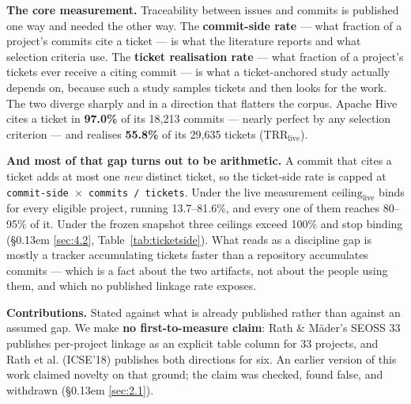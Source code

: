 \documentclass[conference]{IEEEtran}
\begin{document}
\textbf{The core measurement.} Traceability between issues and commits is published one way and needed the other way. The \textbf{commit-side rate} --- what fraction of a project's commits cite a ticket --- is what the literature reports and what selection criteria use. The \textbf{ticket realisation rate} --- what fraction of a project's tickets ever receive a citing commit --- is what a ticket-anchored study actually depends on, because such a study samples tickets and then looks for the work. The two diverge sharply and in a direction that flatters the corpus. Apache Hive cites a ticket in \textbf{97.0\%} of its 18,213 commits --- nearly perfect by any selection criterion --- and realises \textbf{55.8\%} of its 29,635 tickets ($\mathrm{TRR}_\mathrm{live}$).

\textbf{And most of that gap turns out to be arithmetic.} A commit that cites a ticket adds at most one \emph{new} distinct ticket, so the ticket-side rate is capped at \texttt{commit-\allowbreak{}side $\times$ commits /\allowbreak{} tickets}. Under the live measurement $\mathrm{ceiling}_\mathrm{live}$ binds for every eligible project, running 13.7--81.6\%, and every one of them reaches 80--95\% of it. Under the frozen snapshot three ceilings exceed 100\% and stop binding (\S\kern0.13em \ref{sec:4.2}, Table~\ref{tab:ticketside}). What reads as a discipline gap is mostly a tracker accumulating tickets faster than a repository accumulates commits --- which is a fact about the two artifacts, not about the people using them, and which no published linkage rate exposes.

\textbf{Contributions.} Stated against what is already published rather than against an assumed gap. We make \textbf{no first-to-measure claim}: Rath \& M\"ader's SEOSS 33 \cite{rath2019seoss} publishes per-project linkage as an explicit table column for 33 projects, and Rath et al. (ICSE'18) \cite{rath2018traceability} publishes both directions for six. An earlier version of this work claimed novelty on that ground; the claim was checked, found false, and withdrawn (\S\kern0.13em \ref{sec:2.1}).
\end{document}
